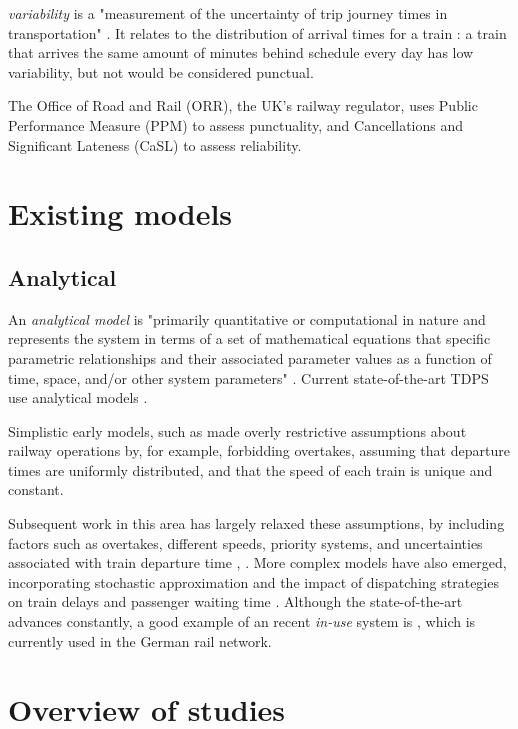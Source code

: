 \documentclass{article}
\begin{document}
\textit{variability} is a "measurement of the uncertainty of trip journey times in transportation" \cite{olsson_haugland_2004}. It relates to the distribution of arrival times for a train \cite{noland_polak_2002}:
a train that arrives the same amount of minutes behind schedule every day has low variability, but not would be considered punctual.

The Office of Road and Rail (ORR), the UK's railway regulator, uses Public Performance Measure (PPM) to assess punctuality, and Cancellations and Significant Lateness (CaSL) to assess reliability.

\section{Existing models}

\subsection{Analytical}

An \textit{analytical model} is "primarily quantitative or computational in nature and represents the system in terms of a set of mathematical equations that specific parametric relationships and their associated
parameter values as a function of time, space, and/or other system parameters" \cite{friedenthal_moore_steiner_2012}. Current state-of-the-art TDPS use analytical models \cite{oneto_fumeo_clerico_canepa_papa_dambra_mazzino_anguita_2016}.

Simplistic early models, such as \cite{frank_1966} made overly restrictive assumptions about railway operations by, for example, forbidding overtakes, assuming that departure times are uniformly distributed,
and that the speed of each train is unique and constant. 

Subsequent work in this area has largely relaxed these assumptions, by including factors such as overtakes, different speeds, priority systems, and uncertainties associated with train departure time \cite{petersen_1974}, \cite{chen_harker_1990}. More complex models have also emerged, incorporating stochastic approximation \cite{carey_kwiecinski_1994} and the impact of dispatching strategies on train delays
and passenger waiting time \cite{ozekici_sengor_1994}. Although the state-of-the-art advances constantly, a good example of an recent \textit{in-use} system is \cite{berger_et_al_2011}, which is currently used in the German rail network.

\clearpage
\section{Overview of studies}
\end{document}
